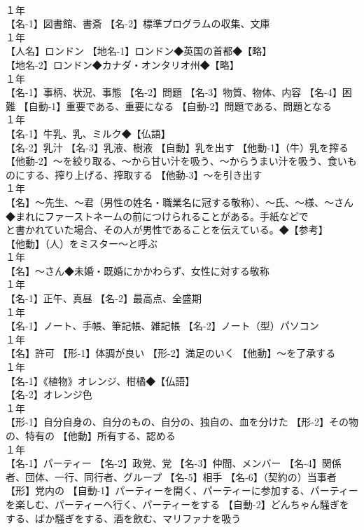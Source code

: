 \documentclass[8pt]{extreport}
\begin{document}
\begin{CJK}{UTF8}{min}
\\	１年	
\\	【名-1】図書館、書斎 【名-2】標準プログラムの収集、文庫
\\	１年	
\\	【人名】ロンドン 【地名-1】ロンドン◆英国の首都◆【略】
\\	【地名-2】ロンドン◆カナダ・オンタリオ州◆【略】
\\	１年	
\\	【名-1】事柄、状況、事態 【名-2】問題 【名-3】物質、物体、内容 【名-4】困難 【自動-1】重要である、重要になる 【自動-2】問題である、問題となる
\\	１年	
\\	【名-1】牛乳、乳、ミルク◆【仏語】
\\	【名-2】乳汁 【名-3】乳液、樹液 【自動】乳を出す 【他動-1】（牛）乳を搾る 【他動-2】～を絞り取る、～から甘い汁を吸う、～からうまい汁を吸う、食いものにする、搾り上げる、搾取する 【他動-3】～を引き出す
\\	１年	
\\	【名】～先生、～君（男性の姓名・職業名に冠する敬称）、～氏、～様、～さん◆まれにファーストネームの前につけられることがある。手紙などで
\\	と書かれていた場合、その人が男性であることを伝えている。◆【参考】
\\	【他動】（人）をミスター～と呼ぶ
\\	１年	
\\	【名】～さん◆未婚・既婚にかかわらず、女性に対する敬称
\\	１年	
\\	【名-1】正午、真昼 【名-2】最高点、全盛期
\\	１年	
\\	【名-1】ノート、手帳、筆記帳、雑記帳 【名-2】ノート（型）パソコン
\\	１年	
\\	【名】許可 【形-1】体調が良い 【形-2】満足のいく 【他動】～を了承する
\\	１年	
\\	【名-1】《植物》オレンジ、柑橘◆【仏語】
\\	【名-2】オレンジ色
\\	１年	
\\	【形-1】自分自身の、自分のもの、自分の、独自の、血を分けた 【形-2】その物の、特有の 【他動】所有する、認める
\\	１年	
\\	【名-1】パーティー 【名-2】政党、党 【名-3】仲間、メンバー 【名-4】関係者、団体、一行、同行者、グループ 【名-5】相手 【名-6】（契約の）当事者 【形】党内の 【自動-1】パーティーを開く、パーティーに参加する、パーティーを楽しむ、パーティーへ行く、パーティーをする 【自動-2】どんちゃん騒ぎをする、ばか騒ぎをする、酒を飲む、マリファナを吸う

\end{CJK}
\end{document}
